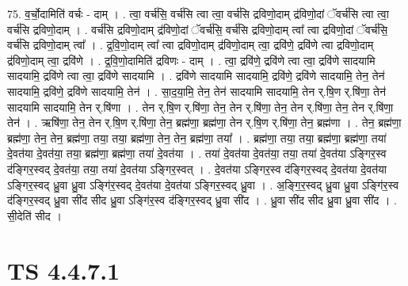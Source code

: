 \documentclass[17pt]{extarticle}
\begin{document}
75. व॒र्चो॒दामिति॑ वर्चः - दाम् । . त्वा॒ वर्च॑सि॒ वर्च॑सि त्वा त्वा॒ वर्च॑सि द्रविणो॒दाम् द्र॑विणो॒दां ॅवर्च॑सि त्वा त्वा॒ वर्च॑सि द्रविणो॒दाम् । . वर्च॑सि द्रविणो॒दाम् द्र॑विणो॒दां ॅवर्च॑सि॒ वर्च॑सि द्रविणो॒दाम् त्वा᳚ त्वा द्रविणो॒दां ॅवर्च॑सि॒ वर्च॑सि द्रविणो॒दाम् त्वा᳚ । . द्र॒वि॒णो॒दाम् त्वा᳚ त्वा द्रविणो॒दाम् द्र॑विणो॒दाम् त्वा॒ द्रवि॑णे॒ द्रवि॑णे त्वा द्रविणो॒दाम् द्र॑विणो॒दाम् त्वा॒ द्रवि॑णे । . द्र॒वि॒णो॒दामिति॑ द्रविणः - दाम् । . त्वा॒ द्रवि॑णे॒ द्रवि॑णे त्वा त्वा॒ द्रवि॑णे सादयामि सादयामि॒ द्रवि॑णे त्वा त्वा॒ द्रवि॑णे सादयामि । . द्रवि॑णे सादयामि सादयामि॒ द्रवि॑णे॒ द्रवि॑णे सादयामि॒ तेन॒ तेन॑ सादयामि॒ द्रवि॑णे॒ द्रवि॑णे सादयामि॒ तेन॑ । . सा॒द॒या॒मि॒ तेन॒ तेन॑ सादयामि सादयामि॒ तेन र्.षि॒ण र्.षि॑णा॒ तेन॑ सादयामि सादयामि॒ तेन र्.षि॑णा । . तेन र्.षि॒ण र्.षि॑णा॒ तेन॒ तेन र्.षि॑णा॒ तेन॒ तेन र्.षि॑णा॒ तेन॒ तेन र्.षि॑णा॒ तेन॑ । . ऋषि॑णा॒ तेन॒ तेन र्.षि॒ण र्.षि॑णा॒ तेन॒ ब्रह्म॑णा॒ ब्रह्म॑णा॒ तेन र्.षि॒ण र्.षि॑णा॒ तेन॒ ब्रह्म॑णा । . तेन॒ ब्रह्म॑णा॒ ब्रह्म॑णा॒ तेन॒ तेन॒ ब्रह्म॑णा॒ तया॒ तया॒ ब्रह्म॑णा॒ तेन॒ तेन॒ ब्रह्म॑णा॒ तया᳚ । . ब्रह्म॑णा॒ तया॒ तया॒ ब्रह्म॑णा॒ ब्रह्म॑णा॒ तया॑ दे॒वत॑या दे॒वत॑या॒ तया॒ ब्रह्म॑णा॒ ब्रह्म॑णा॒ तया॑ दे॒वत॑या । . तया॑ दे॒वत॑या दे॒वत॑या॒ तया॒ तया॑ दे॒वत॑या ऽङ्गिर॒स्व द॑ङ्गिर॒स्वद् दे॒वत॑या॒ तया॒ तया॑ दे॒वत॑या ऽङ्गिर॒स्वत् । . दे॒वत॑या ऽङ्गिर॒स्व द॑ङ्गिर॒स्वद् दे॒वत॑या दे॒वत॑या ऽङ्गिर॒स्वद् ध्रु॒वा ध्रु॒वा ऽङ्गि॑र॒स्वद् दे॒वत॑या दे॒वत॑या ऽङ्गिर॒स्वद् ध्रु॒वा । . अ॒ङ्गि॒र॒स्वद् ध्रु॒वा ध्रु॒वा ऽङ्गि॑र॒स्व द॑ङ्गिर॒स्वद् ध्रु॒वा सी॑द सीद ध्रु॒वा ऽङ्गि॑र॒स्व द॑ङ्गिर॒स्वद् ध्रु॒वा सी॑द । . ध्रु॒वा सी॑द सीद ध्रु॒वा ध्रु॒वा सी॑द । . सी॒देति॑ सीद । \newline
\pagebreak
{}

\section{ TS 4.4.7.1 }
\end{document}
